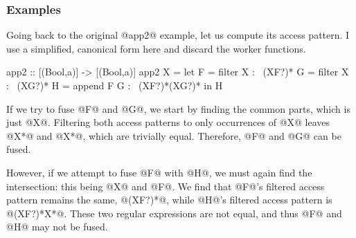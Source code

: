 \subsubsection{Examples}
Going back to the original @app2@ example, let us compute its access pattern.
I use a simplified, canonical form here and discard the worker functions.

\begin{code}
app2 :: [(Bool,a)] -> [(Bool,a)]
app2 X
 = let F = filter X     :~ (XF?)*
       G = filter X     :~ (XG?)*
       H = append F G   :~ (XF?)*(XG?)*
   in  H
\end{code}
If we try to fuse @F@ and @G@, we start by finding the common parts, which is just @X@. Filtering both access patterns to only occurrences of @X@ leaves @X*@ and @X*@, which are trivially equal.
Therefore, @F@ and @G@ can be fused.

However, if we attempt to fuse @F@ with @H@, we must again find the intersection: this being @X@ and @F@.
We find that @F@'s filtered access pattern remains the same, @(XF?)*@, while @H@'s filtered access pattern is @(XF?)*X*@. These two regular expressions are not equal, and thus @F@ and @H@ may not be fused.

